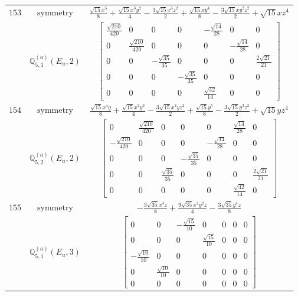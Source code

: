 \documentclass[fleqn,8pt,landscape]{jsarticle}
\begin{document}
\begin{longtable}{ccc}
$ 153 $ & $ \text{symmetry} $ & $ \frac{\sqrt{15} x^{5}}{8} + \frac{\sqrt{15} x^{3} y^{2}}{4} - \frac{3 \sqrt{15} x^{3} z^{2}}{2} + \frac{\sqrt{15} x y^{4}}{8} - \frac{3 \sqrt{15} x y^{2} z^{2}}{2} + \sqrt{15} x z^{4} $ \\
$  $ & $ \mathbb{Q}_{5,1}^{(a)}(E_{u},2) $ & $ \begin{bmatrix} \frac{\sqrt{210}}{420} & 0 & 0 & 0 & - \frac{\sqrt{14}}{28} & 0 & 0 \\ 0 & \frac{\sqrt{210}}{420} & 0 & 0 & 0 & - \frac{\sqrt{14}}{28} & 0 \\ 0 & 0 & - \frac{\sqrt{35}}{35} & 0 & 0 & 0 & \frac{2 \sqrt{21}}{21} \\ 0 & 0 & 0 & - \frac{\sqrt{35}}{35} & 0 & 0 & 0 \\ 0 & 0 & 0 & 0 & \frac{\sqrt{42}}{14} & 0 & 0 \end{bmatrix} $ \\ \hline
$ 154 $ & $ \text{symmetry} $ & $ \frac{\sqrt{15} x^{4} y}{8} + \frac{\sqrt{15} x^{2} y^{3}}{4} - \frac{3 \sqrt{15} x^{2} y z^{2}}{2} + \frac{\sqrt{15} y^{5}}{8} - \frac{3 \sqrt{15} y^{3} z^{2}}{2} + \sqrt{15} y z^{4} $ \\
$  $ & $ \mathbb{Q}_{5,2}^{(a)}(E_{u},2) $ & $ \begin{bmatrix} 0 & \frac{\sqrt{210}}{420} & 0 & 0 & 0 & \frac{\sqrt{14}}{28} & 0 \\ - \frac{\sqrt{210}}{420} & 0 & 0 & 0 & - \frac{\sqrt{14}}{28} & 0 & 0 \\ 0 & 0 & 0 & - \frac{\sqrt{35}}{35} & 0 & 0 & 0 \\ 0 & 0 & \frac{\sqrt{35}}{35} & 0 & 0 & 0 & \frac{2 \sqrt{21}}{21} \\ 0 & 0 & 0 & 0 & 0 & \frac{\sqrt{42}}{14} & 0 \end{bmatrix} $ \\ \hline
$ 155 $ & $ \text{symmetry} $ & $ - \frac{3 \sqrt{35} x^{4} z}{8} + \frac{9 \sqrt{35} x^{2} y^{2} z}{4} - \frac{3 \sqrt{35} y^{4} z}{8} $ \\
$  $ & $ \mathbb{Q}_{5,1}^{(a)}(E_{u},3) $ & $ \begin{bmatrix} 0 & 0 & - \frac{\sqrt{15}}{10} & 0 & 0 & 0 & 0 \\ 0 & 0 & 0 & \frac{\sqrt{15}}{10} & 0 & 0 & 0 \\ - \frac{\sqrt{10}}{10} & 0 & 0 & 0 & 0 & 0 & 0 \\ 0 & \frac{\sqrt{10}}{10} & 0 & 0 & 0 & 0 & 0 \\ 0 & 0 & 0 & 0 & 0 & 0 & 0 \end{bmatrix} $ \\ \hline

\end{longtable}
\end{document}
